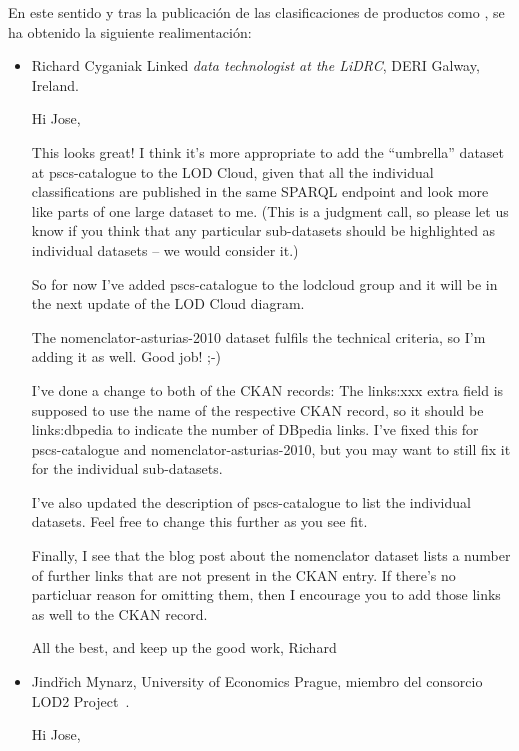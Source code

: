 En este sentido y tras la publicación de las clasificaciones de productos como \linkeddata, se ha obtenido la siguiente
realimentación:
\begin{itemize}

 \item Richard Cyganiak Linked \textit{data technologist at the LiDRC}, DERI Galway, Ireland.

\begin{Frame} 
\begin{itshape}
Hi Jose,

This looks great! I think it's more appropriate to add the “umbrella” dataset at
pscs-catalogue to the LOD Cloud, given that all the individual classifications
are published in the same SPARQL endpoint and look more like parts of one large
dataset to me. (This is a judgment call, so please let us know if you think that
any particular sub-datasets should be highlighted as individual datasets – we
would consider it.)

So for now I've added pscs-catalogue to the lodcloud group and it will be in the
next update of the LOD Cloud diagram.

The nomenclator-asturias-2010 dataset fulfils the technical criteria, so I'm
adding it as well. Good job! ;-)

I've done a change to both of the CKAN records: The links:xxx extra field is
supposed to use the name of the respective CKAN record, so it should be
links:dbpedia to indicate the number of DBpedia links. I've fixed this for
pscs-catalogue and nomenclator-asturias-2010, but you may want to still fix it
for the individual sub-datasets.

I've also updated the description of pscs-catalogue to list the individual
datasets. Feel free to change this further as you see fit.

Finally, I see that the blog post about the nomenclator dataset lists a number
of further links that are not present in the CKAN entry. If there's no
particluar reason for omitting them, then I encourage you to add those links as
well to the CKAN record.

All the best, and keep up the good work,
Richard
\end{itshape}
\end{Frame}

\item Jindřich Mynarz, University of Economics Prague, miembro del consorcio LOD2 Project~\cite{lod2-project}.

\begin{Frame}
\begin{itshape}
Hi Jose,


\end{itshape}
\end{Frame}
\end{itemize}
